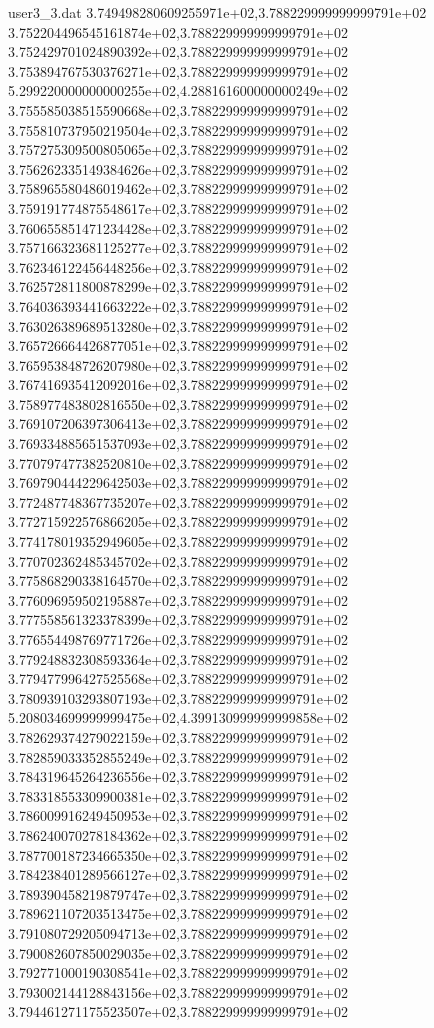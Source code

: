 \begin{filecontents}{user3_3.dat}
3.749498280609255971e+02,3.788229999999999791e+02
3.752204496545161874e+02,3.788229999999999791e+02
3.752429701024890392e+02,3.788229999999999791e+02
3.753894767530376271e+02,3.788229999999999791e+02
5.299220000000000255e+02,4.288161600000000249e+02
3.755585038515590668e+02,3.788229999999999791e+02
3.755810737950219504e+02,3.788229999999999791e+02
3.757275309500805065e+02,3.788229999999999791e+02
3.756262335149384626e+02,3.788229999999999791e+02
3.758965580486019462e+02,3.788229999999999791e+02
3.759191774875548617e+02,3.788229999999999791e+02
3.760655851471234428e+02,3.788229999999999791e+02
3.757166323681125277e+02,3.788229999999999791e+02
3.762346122456448256e+02,3.788229999999999791e+02
3.762572811800878299e+02,3.788229999999999791e+02
3.764036393441663222e+02,3.788229999999999791e+02
3.763026389689513280e+02,3.788229999999999791e+02
3.765726664426877051e+02,3.788229999999999791e+02
3.765953848726207980e+02,3.788229999999999791e+02
3.767416935412092016e+02,3.788229999999999791e+02
3.758977483802816550e+02,3.788229999999999791e+02
3.769107206397306413e+02,3.788229999999999791e+02
3.769334885651537093e+02,3.788229999999999791e+02
3.770797477382520810e+02,3.788229999999999791e+02
3.769790444229642503e+02,3.788229999999999791e+02
3.772487748367735207e+02,3.788229999999999791e+02
3.772715922576866205e+02,3.788229999999999791e+02
3.774178019352949605e+02,3.788229999999999791e+02
3.770702362485345702e+02,3.788229999999999791e+02
3.775868290338164570e+02,3.788229999999999791e+02
3.776096959502195887e+02,3.788229999999999791e+02
3.777558561323378399e+02,3.788229999999999791e+02
3.776554498769771726e+02,3.788229999999999791e+02
3.779248832308593364e+02,3.788229999999999791e+02
3.779477996427525568e+02,3.788229999999999791e+02
3.780939103293807193e+02,3.788229999999999791e+02
5.208034699999999475e+02,4.399130999999999858e+02
3.782629374279022159e+02,3.788229999999999791e+02
3.782859033352855249e+02,3.788229999999999791e+02
3.784319645264236556e+02,3.788229999999999791e+02
3.783318553309900381e+02,3.788229999999999791e+02
3.786009916249450953e+02,3.788229999999999791e+02
3.786240070278184362e+02,3.788229999999999791e+02
3.787700187234665350e+02,3.788229999999999791e+02
3.784238401289566127e+02,3.788229999999999791e+02
3.789390458219879747e+02,3.788229999999999791e+02
3.789621107203513475e+02,3.788229999999999791e+02
3.791080729205094713e+02,3.788229999999999791e+02
3.790082607850029035e+02,3.788229999999999791e+02
3.792771000190308541e+02,3.788229999999999791e+02
3.793002144128843156e+02,3.788229999999999791e+02
3.794461271175523507e+02,3.788229999999999791e+02

\end{filecontents}
